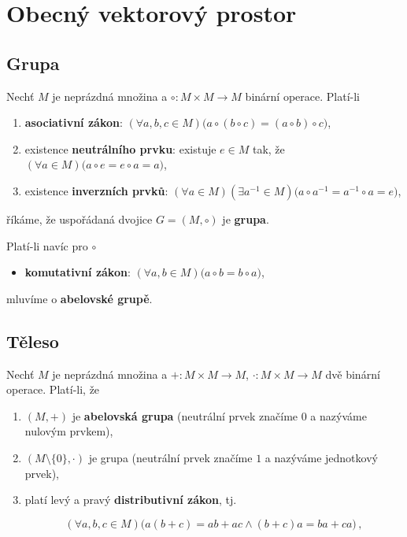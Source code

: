 \section{Obecný vektorový prostor}

\subsection*{Grupa}

Nechť $M$ je neprázdná množina a $\circ: M \times M \to M$ binární operace.
Platí-li

\begin{enumerate}
      \item \textbf{asociativní zákon}: $(\forall a,b,c \in M) \big(a \circ (b \circ c) = (a \circ b) \circ c \big)$,
      \item existence \textbf{neutrálního prvku}: existuje $e \in M$ tak, že $(\forall a
                  \in M) \big( a \circ e = e \circ a = a \big)$,
      \item existence \textbf{inverzních prvků}: $(\forall a \in M)(\exists a^{-1}\in M)
                  \big(a \circ a^{-1} = a^{-1} \circ a = e\big)$,
\end{enumerate}

říkáme, že uspořádaná dvojice $G = (M, \circ)$ je \textbf{grupa}.

Platí-li navíc pro $\circ$

\begin{itemize}
      \item \textbf{komutativní zákon}: $(\forall a,b \in M) \big(a \circ b = b \circ a\big)$,
\end{itemize}

mluvíme o \textbf{abelovské grupě}.

\subsection*{Těleso}

Nechť $M$ je neprázdná množina a $+: M \times M \to M$, $\cdot : M \times M \to
      M$ dvě binární operace. Platí-li, že

\begin{enumerate}
      \item $(M, +)$ je \textbf{abelovská grupa} (neutrální prvek značíme $0$ a nazýváme nulovým prvkem),
      \item $(M\setminus \{0\}, \cdot)$ je grupa (neutrální prvek značíme $1$ a nazýváme jednotkový prvek),
      \item platí levý a pravý \textbf{distributivní zákon}, tj.

            \[ (\forall a,b,c \in M) \Big( a(b + c) = ab + ac \wedge (b+c)a = ba + ca\Big)\,, \]
\end{enumerate}

